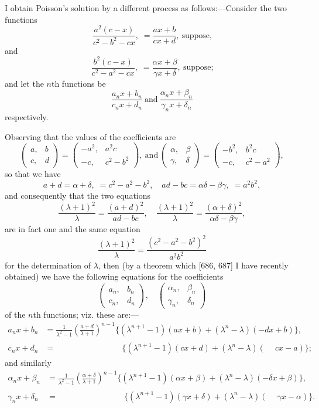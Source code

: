 \documentclass[12pt,a4paper,oneside]{book}
\theoremstyle{plain}
\theoremstyle{definition}
\theoremstyle{remark}
\begin{document}
I obtain Poisson's solution by a different process as follows:---Consider the two functions
\[
\frac{a^2(c-x)}{c^2-b^2-cx},\; =\frac{ax+b}{cx+d},\ \text{suppose,}
\]
and
\[
\frac{b^2(c-x)}{c^2-a^2-cx},\; =\frac{\alpha x+\beta}{\gamma x+\delta},\ \text{suppose;}
\]
and let the $n$th functions be
\[
\frac{a_n x + b_n}{c_n x + d_n}\ \text{and}\ \frac{\alpha_n x + \beta_n}{\gamma_n x + \delta_n}
\]
respectively.

Observing that the values of the coefficients are
\[
\begin{pmatrix} a, & b \\ c, & d \end{pmatrix}
= \begin{pmatrix} -a^2, & a^2 c \\ -c, & c^2-b^2 \end{pmatrix},\ \text{and}\ 
\begin{pmatrix} \alpha, & \beta \\ \gamma, & \delta \end{pmatrix}
= \begin{pmatrix} -b^2, & b^2 c \\ -c, & c^2-a^2 \end{pmatrix},
\]
so that we have
\[
a+d = \alpha+\delta,\; = c^2-a^2-b^2,\quad ad-bc = \alpha\delta-\beta\gamma,\; = a^2b^2,
\]
and consequently that the two equations
\[
\frac{(\lambda+1)^2}{\lambda} = \frac{(a+d)^2}{ad-bc},\quad
\frac{(\lambda+1)^2}{\lambda} = \frac{(\alpha+\delta)^2}{\alpha\delta-\beta\gamma},
\]
are in fact one and the same equation
\[
\frac{(\lambda+1)^2}{\lambda} = \frac{(c^2-a^2-b^2)^2}{a^2b^2}
\]
for the determination of $\lambda$, then (by a theorem which [686, 687] I have recently obtained) we have the following equations for the coefficients
\[
\begin{pmatrix} a_n, & b_n \\ c_n, & d_n \end{pmatrix},\quad
\begin{pmatrix} \alpha_n, & \beta_n \\ \gamma_n, & \delta_n \end{pmatrix}
\]
of the $n$th functions; viz. these are:---
\begin{align*}
a_n x + b_n &= \frac{1}{\lambda^2-1}\left(\frac{a+d}{\lambda+1}\right)^{n-1}
\{ (\lambda^{n+1}-1)(ax+b) + (\lambda^n-\lambda)(-dx+b) \},\\
c_n x + d_n &= \phantom{\frac{1}{\lambda^2-1}\left(\frac{a+d}{\lambda+1}\right)^{n-1}}
\;\;\;\{ (\lambda^{n+1}-1)(cx+d) + (\lambda^n-\lambda)(\phantom{-}cx-a) \};
\end{align*}
and similarly
\begin{align*}
\alpha_n x + \beta_n &= \frac{1}{\lambda^2-1}\left(\frac{\alpha+\delta}{\lambda+1}\right)^{n-1}
\{ (\lambda^{n+1}-1)(\alpha x+\beta) + (\lambda^n-\lambda)(-\delta x+\beta) \},\\
\gamma_n x + \delta_n &= \phantom{\frac{1}{\lambda^2-1}\left(\frac{\alpha+\delta}{\lambda+1}\right)^{n-1}}
\;\;\;\{ (\lambda^{n+1}-1)(\gamma x+\delta) + (\lambda^n-\lambda)(\phantom{-}\gamma x-\alpha) \}.
\end{align*}
\end{document}
